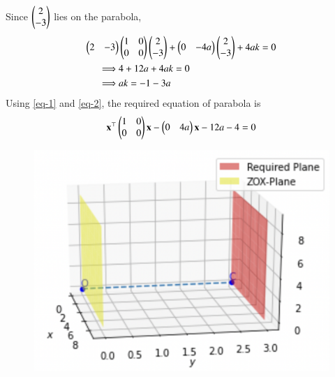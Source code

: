 \documentclass[journal,12pt,twocolumn]{IEEEtran}
\begin{document}
Since $\begin{pmatrix}2\\-3\end{pmatrix}$ lies on the parabola,
\begin{align}
    \begin{pmatrix}2&-3\end{pmatrix}&\begin{pmatrix}1&0\\0&0\end{pmatrix}\begin{pmatrix}2\\-3\end{pmatrix}+\begin{pmatrix}0&-4a\end{pmatrix}\begin{pmatrix}2\\-3\end{pmatrix}+4ak=0\\
    \implies& 4+12a+4ak=0\\
    \implies& ak=-1-3a \label{eq-2}
\end{align}
Using \eqref{eq-1} and \eqref{eq-2}, the required equation of parabola is
\begin{align}
    \mathbf{x}^\top\begin{pmatrix}1&0\\0&0\end{pmatrix}\mathbf{x}-\begin{pmatrix}0&4a\end{pmatrix}\mathbf{x}-12a-4=0
\end{align}

\begin{figure}[h!]
    \includegraphics[width=\columnwidth]{figure.png}
\end{figure}
\end{document}
